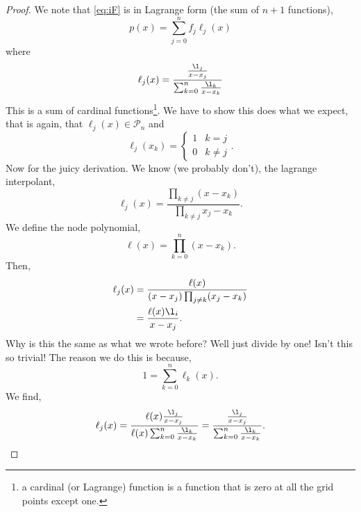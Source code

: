 \begin{proof}
  We note that \ref{eq:iF} is in Lagrange form (the sum of $n + 1$ functions),
  $$ p(x) = \sum_{j=0}^n f_j \ell_j(x) $$
  where
  $$ \ell_j(x) = \frac{\frac{\l_j}{x - x_j}}{\sum_{k=0}^n \frac{\l_k}{x - x_k}} $$
  This is a sum of cardinal functions\footnote{a cardinal (or Lagrange) function is a function that is zero at all the grid points except one.}. We have to show this does what we expect, that is again, that $\ell_j(x)\in \mathcal{P}_n$ and
  $$ \ell_j(x_k) = \begin{cases}
    1 & k = j \\
    0 & k \ne j
  \end{cases}. $$
  Now for the juicy derivation. We know (we probably don't), the lagrange interpolant,
  $$ \ell_j(x) = \frac{\prod_{k \ne j} (x - x_k)}{\prod_{k \ne j} x_j - x_k}. $$
  We define the node polynomial,
  $$ \ell(x) = \prod_{k=0}^n (x - x_k). $$
  Then,
  \begin{align*}
    \ell_j(x) &= \frac{\ell(x)}{(x - x_j)\prod_{j \ne k} (x_j - x_k)} \\
    &= \frac{\ell(x)\l_i}{x - x_j}.
  \end{align*}
  Why is this the same as what we wrote before? Well just divide by one! Isn't this so trivial! The reason we do this is because,
  $$ 1 = \sum_{k=0}^n \ell_k(x). $$
  We find,
  $$ \ell_j(x) = \frac{\ell(x) \frac{\l_j}{x - x_j}}{\ell(x) \sum_{k=0}^n \frac{\l_k}{x - x_k}} = \frac{\frac{\l_j}{x - x_j}}{ \sum_{k=0}^n \frac{\l_k}{x - x_k} }. $$
\end{proof}